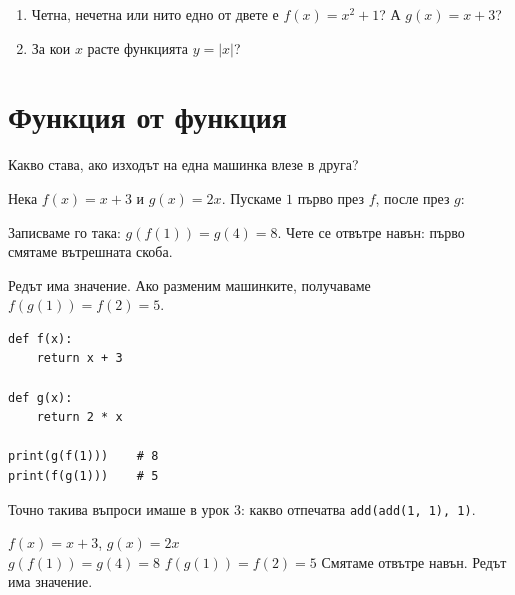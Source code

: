 \documentclass[11pt,a4paper]{article}
\begin{document}
\begin{trybox}
\begin{enumerate}[label=\textbf{\arabic*.},start=17]
  \item Четна, нечетна или нито едно от двете е $f(x)=x^2+1$? А $g(x)=x+3$?
  \item За кои $x$ расте функцията $y=|x|$?
\end{enumerate}
\end{trybox}

\section{Функция от функция}

Какво става, ако изходът на една машинка влезе в друга?

Нека $f(x)=x+3$ и $g(x)=2x$. Пускаме $1$ първо през $f$, после през $g$:

\begin{center}
\end{center}

Записваме го така: $g(f(1))=g(4)=8$. Чете се отвътре навън: първо смятаме вътрешната скоба.

Редът има значение. Ако разменим машинките, получаваме $f(g(1))=f(2)=5$.

\begin{pybox}
\begin{Verbatim}
def f(x):
    return x + 3

def g(x):
    return 2 * x

print(g(f(1)))    # 8
print(f(g(1)))    # 5
\end{Verbatim}
Точно такива въпроси имаше в урок 3: какво отпечатва \texttt{add(add(1, 1), 1)}.
\end{pybox}

\begin{board}
$f(x)=x+3$, \; $g(x)=2x$\\[2pt]
$g(f(1))=g(4)=8$ \qquad $f(g(1))=f(2)=5$ \qquad Смятаме отвътре навън. Редът има значение.
\end{board}
\end{document}
